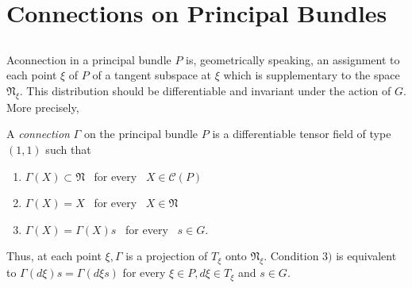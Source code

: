
\chapter{Connections on Principal Bundles}\label{chap3}%

\section{}\label{chap3:sec1} %

A\pageoriginale connection in a principal bundle $P$ is, geometrically speaking, an
assignment to each point $\xi$ of $P$ of a tangent subspace at $\xi$
which is supplementary to the space $\mathfrak{N}_\xi$. This
distribution should be differentiable and invariant under the action
of $G$. More precisely, 

\setcounter{defn}{0}
\begin{defn}\label{chap3:sec1:def1}%
  A {\em{connection}} $\Gamma$ on the principal bundle $P$ is a
  differentiable tensor field of type $(1,1)$ such that 
  \begin{enumerate}[1)]
  \item $\Gamma (X) \subset \mathfrak{N}$ ~for every~ $X \in \mathscr{C} (P)$
  \item $\Gamma (X) = X$ ~for every~ $X \in \mathfrak{N}$
  \item $\Gamma (X) = \Gamma(X)s$ ~for every~ $s \in G$.
  \end{enumerate}
\end{defn}

Thus, at each point $\xi, \Gamma$ is a projection of $T_\xi$ onto
$\mathfrak{N}_\xi$. Condition $3)$ is equivalent to $\Gamma (d \xi)s =
\Gamma (d \xi s)$ for every $\xi \in P, d \xi \in T_\xi$ and $s \in
G$. 

